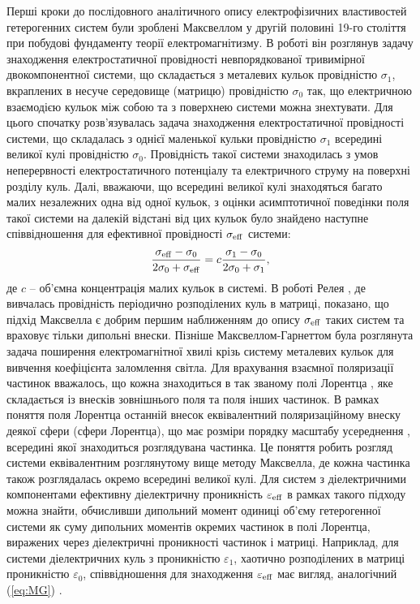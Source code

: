\documentclass[14pt,twoside]{vakthesis}
\begin{document}
Перші кроки до послідовного аналітичного опису електрофізичних властивостей гетерогенних систем були зроблені Максвеллом у другій половині 19-го століття при побудові фундаменту теорії електромагнітизму.
В роботі \cite{Maxwell1892} він розглянув задачу знаходження електростатичної провідності невпорядкованої тривимірної двокомпонентної системи, що складається з металевих кульок провідністю $\sigma_1$, вкраплених в несуче середовище (матрицю) провідністю $\sigma_0$ так, що електричною взаємодією кульок між собою та з поверхнею системи можна знехтувати. 
Для цього спочатку розв'язувалась задача знаходження електростатичної провідності системи, що складалась з однієї маленької кульки провідністю $\sigma_1$ всередині великої кулі провідністю $\sigma_0$. Провідність такої системи знаходилась з умов неперервності електростатичного потенціалу та електричного струму на поверхні розділу куль. Далі, вважаючи, що всередині великої кулі знаходяться багато малих незалежних одна від одної кульок, з оцінки асимптотичної поведінки поля такої системи на далекій відстані від цих кульок  було знайдено наступне співвідношення для ефективної провідності $\sigma_{\rm eff}$  системи:
\begin{equation}\label{eq:MG}
\frac{\sigma_{\rm eff} - \sigma_0}{2\sigma_0 + \sigma_{\rm eff}} = c \frac{\sigma_1 - \sigma_0}{2\sigma_0 + \sigma_1},
\end{equation}
де $c$ -- об'ємна концентрація малих кульок в системі. 
В роботі Релея \cite{Rayleigh}, де вивчалась провідність періодично розподілених куль в матриці, показано, що підхід Максвелла є добрим першим наближенням до опису $\sigma_{\rm eff}$ таких систем та враховує тільки дипольні внески.
Пізніше Максвеллом-Гарнеттом  \cite{M-G1904} була розглянута задача поширення електромагнітної хвилі крізь систему металевих кульок для вивчення коефіцієнта заломлення світла. Для врахування взаємної поляризації частинок вважалось, що кожна знаходиться в так званому полі Лорентца \cite{Lorentz1870, Choy}, яке складається із внесків зовнішнього поля та поля інших частинок. В рамках поняття поля Лорентца останній внесок еквівалентний поляризаційному внеску деякої сфери (сфери Лорентца), що має розміри порядку масштабу усереднення \cite{Choy}, всередині якої знаходиться розглядувана частинка. 
Це поняття робить розгляд системи еквівалентним розглянутому вище методу Максвелла, де кожна частинка також розглядалась окремо всередині великої кулі.
Для систем з діелектричними компонентами ефективну діелектричну проникність $\varepsilon_{\rm eff}$ в рамках такого підходу можна знайти, обчисливши дипольний момент одиниці об'єму гетерогенної системи як суму дипольних моментів окремих частинок в полі Лорентца, виражених через діелектричні проникності частинок і матриці.
Наприклад, для системи діелектричних куль з проникністю $\varepsilon_1$, хаотично розподілених в матриці проникністю $\varepsilon_0$, співвідношення для знаходження $\varepsilon_{\rm eff}$ має вигляд, аналогічний (\ref{eq:MG}) \cite{Markel2016,Choy}.
\end{document}
